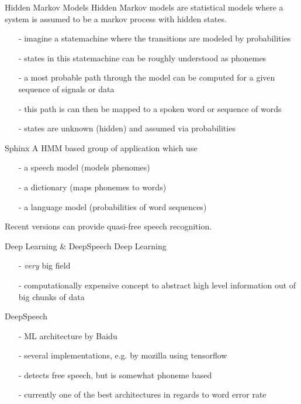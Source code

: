 \documentclass{beamer}
\begin{document}
	\begin{frame}{Hidden Markov Models}
		Hidden Markov models are statistical models where a system is assumed to be a markov process with hidden states.
		\begin{itemize}
			\item[-] imagine a statemachine where the transitions are modeled by probabilities
			\item[-] states in this statemachine can be roughly understood as phonemes
			\item[-] a most probable path through the model can be computed for a given sequence of signals or data 
			\item[-] this path is can then be mapped to a spoken word or sequence of words
			\item[-] states are unknown (hidden) and assumed via probabilities
		\end{itemize}
	\end{frame}
	
	\begin{frame}{Sphinx}
		A HMM based group of application which use 
		\begin{itemize}
			\item[-] a speech model (models phenomes)
			\item[-] a dictionary (maps phonemes to words)
			\item[-] a language model (probabilities of word sequences)
		\end{itemize}
		
		Recent versions can provide quasi-free speech recognition.
	\end{frame}
	
	\begin{frame}{Deep Learning \& DeepSpeech}
		Deep Learning
		\begin{itemize}
			\item[-] \emph{very} big field
			\item[-] computationally expensive concept to abstract high level information out of big chunks of data
		\end{itemize}
		\pause
		DeepSpeech
		\begin{itemize}
			\item[-] ML architecture by Baidu
			\item[-] several implementations, e.g. by mozilla using tensorflow
			\item[-] detects free speech, but is somewhat phoneme based
			\item[-] currently one of the best architectures in regards to word error rate
		\end{itemize}
	\end{frame}
	
\end{document}
